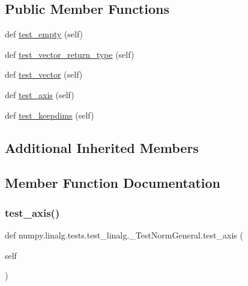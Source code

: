 \subsection*{Public Member Functions}
\begin{DoxyCompactItemize}
\item 
def \hyperlink{classnumpy_1_1linalg_1_1tests_1_1test__linalg_1_1__TestNormGeneral_a1ffa06cff2402e0dfda265cc9e4d1ec9}{test\+\_\+empty} (self)
\item 
def \hyperlink{classnumpy_1_1linalg_1_1tests_1_1test__linalg_1_1__TestNormGeneral_acc9897a54ad2a2c3792d4920a944f951}{test\+\_\+vector\+\_\+return\+\_\+type} (self)
\item 
def \hyperlink{classnumpy_1_1linalg_1_1tests_1_1test__linalg_1_1__TestNormGeneral_afd761a3b47bd748de7f552d40d31c430}{test\+\_\+vector} (self)
\item 
def \hyperlink{classnumpy_1_1linalg_1_1tests_1_1test__linalg_1_1__TestNormGeneral_acf709aa0b30f60bd85b62859528eba56}{test\+\_\+axis} (self)
\item 
def \hyperlink{classnumpy_1_1linalg_1_1tests_1_1test__linalg_1_1__TestNormGeneral_abe1b32b8055d4867d61ccf38b43b1475}{test\+\_\+keepdims} (self)
\end{DoxyCompactItemize}
\subsection*{Additional Inherited Members}


\subsection{Member Function Documentation}
\mbox{\label{classnumpy_1_1linalg_1_1tests_1_1test__linalg_1_1__TestNormGeneral_acf709aa0b30f60bd85b62859528eba56}} 
\subsubsection{\texorpdfstring{test\+\_\+axis()}{test\_axis()}}
{\footnotesize\ttfamily def numpy.\+linalg.\+tests.\+test\+\_\+linalg.\+\_\+\+Test\+Norm\+General.\+test\+\_\+axis (\begin{DoxyParamCaption}\item[{}]{self }\end{DoxyParamCaption})}

